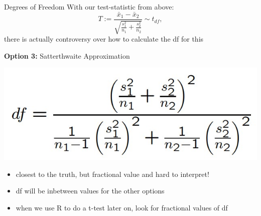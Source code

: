 \documentclass{beamer}
\begin{document}
\begin{frame}{Degrees of Freedom}
With our test-statistic from above:
\begin{equation*}
    T := \frac{\bar{x}_1-\bar{x}_2}{\sqrt{\frac{s_1^2}{n_1}+\frac{s_2^2}{n_2}}} \sim t_{df},
\end{equation*}
there is actually controversy over how to calculate the df for this \vspace{6mm}

\textbf{Option 3:} Satterthwaite Approximation
\begin{center}
    \includegraphics[scale=.6]{img/satterthwaite_df_approx.jpg}
\end{center}

\begin{itemize}
    \item closest to the truth, but fractional value and hard to interpret!
    \item df will be inbetween values for the other options
    \item when we use R to do a t-test later on, look for fractional values of df
\end{itemize}
\end{frame}
\end{document}
